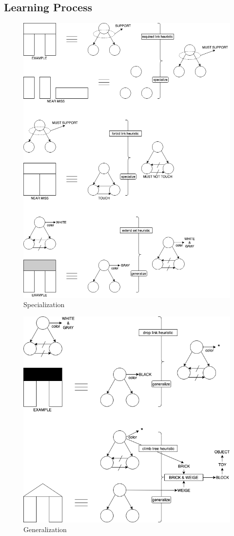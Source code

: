 \documentclass[12pt]{book}
\begin{document}
\subsection{Learning Process}
\begin{figure}[ht]
	\centering
	\includegraphics[scale=0.5]{Figure/Figure15_1.png}
	\caption{Specialization}
\end{figure}
\newpage
\begin{figure}[ht]
	\centering
	\includegraphics[scale=0.58]{Figure/Figure15_2.png}
	\caption{Generalization}
\end{figure}
\end{document}
